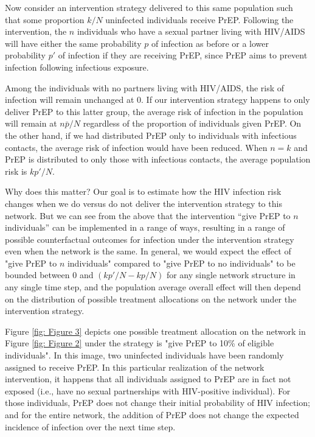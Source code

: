 \documentclass{article}
\theoremstyle{definition}
\begin{document}
Now consider an intervention strategy delivered to this same population such that some proportion $k/N$ uninfected individuals receive PrEP.  Following the intervention, the $n$ individuals who have a sexual partner living with HIV/AIDS will have either the same probability $p$ of infection as before or a lower probability $p'$ of infection if they are receiving PrEP, since PrEP aims to prevent infection following infectious exposure. 

Among the individuals with no partners living with HIV/AIDS, the risk of infection will remain unchanged at 0. If our intervention strategy happens to only deliver PrEP to this latter group, the average risk of infection in the population will remain at $n\bar{p}/N$ regardless of the proportion of individuals given PrEP. On the other hand, if we had distributed PrEP only to individuals with infectious contacts, the average risk of infection would have been reduced. When $n=k$ and PrEP is distributed to only those with infectious contacts, the average population risk is $kp'/N$.

Why does this matter? Our goal is to estimate how the HIV infection risk changes when we do versus do not deliver the intervention strategy to this network. But we can see from the above that the intervention “give PrEP to $n$ individuals” can be implemented in a range of ways, resulting in a range of possible counterfactual outcomes for infection under the intervention strategy even when the network is the same. In general, we would expect the effect of "give PrEP to $n$ individuals" compared to "give PrEP to no individuals" to be bounded between 0 and $(kp'/N - kp/N)$ for any single network structure in any single time step, and the population average overall effect will then depend on the distribution of possible treatment allocations on the network under the intervention strategy. 

Figure \ref{fig: Figure 3}  depicts one possible treatment allocation on the network in Figure \ref{fig: Figure 2} under the strategy is "give PrEP to 10\% of eligible individuals". In this image, two uninfected individuals have been randomly assigned to receive PrEP. In this particular realization of the network intervention, it happens that all individuals assigned to PrEP are in fact not exposed (i.e., have no sexual partnerships with HIV-positive individual). For those individuals, PrEP does not change their initial probability of HIV infection; and for the entire network, the addition of PrEP does not change the expected incidence of infection over the next time step.
\end{document}
